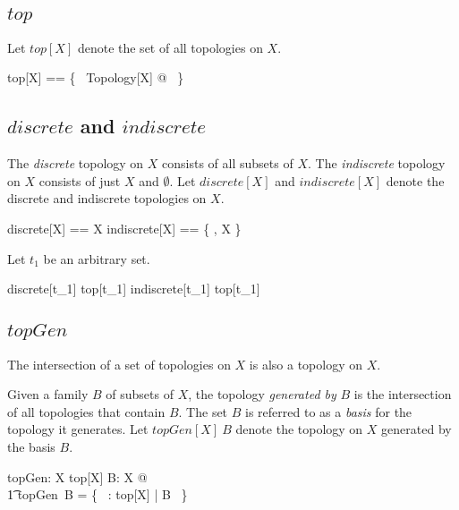 \documentclass[11pt, oneside]{article}
\begin{document}
\subsection{$top$}

Let $top[X]$ denote the set of all topologies on $X$.

\begin{zed}
	top[X] == \{~ Topology[X] @ \tau ~\}
\end{zed}

\subsection{$discrete$ and $indiscrete$}

The {\it discrete} topology on $X$ consists of all subsets of $X$.
The {\it indiscrete} topology on $X$ consists of just $X$ and $\emptyset$.
Let $discrete[X]$ and $indiscrete[X]$ denote the discrete and indiscrete topologies on $X$.

\begin{zed}
	discrete[X] == \power X
\also
	indiscrete[X] ==  \{ \emptyset, X \}
\end{zed}

\begin{example}
Let $t_1$ be an arbitrary set.

\begin{zed}
	discrete[t_1] \in top[t_1] 
\also
	indiscrete[t_1] \in top[t_1]
\end{zed}

\end{example}

\subsection{$topGen$}

\begin{remark}

The intersection of a set of topologies on $X$ is also a topology on $X$.

\end{remark}

Given a family $B$ of subsets of $X$, the topology {\it generated by} $B$ is the intersection of all
topologies that contain $B$.
The set $B$ is referred to as a {\it basis} for the topology it generates.
Let $topGen[X]~B$ denote the topology on $X$ generated by the basis $B$.

\begin{gendef}[X]
	topGen: \family X \fun top[X]
\where
	\forall B: \family X @ \\
	\t1	topGen~B = \bigcap \{~ \tau: top[X] | B \subseteq \tau ~\}
\end{gendef}
\end{document}
